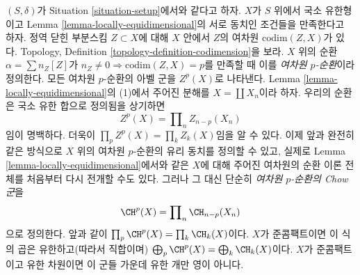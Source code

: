 \noindent
$(S, \delta)$가 Situation \ref{situation-setup}에서와 같다고 하자.
$X$가 $S$ 위에서 국소 유한형이고 Lemma
\ref{lemma-locally-equidimensional}의 서로 동치인 조건들을 만족한다고
하자. 정역 닫힌 부분스킴 $Z \subset X$에 대해 $X$ 안에서 $Z$의
여차원 $\text{codim}(Z, X)$가 있다. Topology, Definition
\ref{topology-definition-codimension}을 보라.
$X$ 위의 순환 $\alpha = \sum n_Z[Z]$가
$n_Z \not = 0 \Rightarrow \text{codim}(Z, X) = p$를 만족할 때 이를
{\it 여차원 $p$-순환}이라 정의한다. 모든 여차원 $p$-순환의 아벨 군을
$Z^p(X)$로 나타낸다. Lemma \ref{lemma-locally-equidimensional}의 (1)에서
주어진 분해를 $X = \coprod X_n$이라 하자. 우리의 순환은 국소 유한
합으로 정의됨을 상기하면
$$
Z^p(X) = \prod\nolimits_n Z_{n - p}(X_n)
$$
임이 명백하다. 더욱이 $\prod_p Z^p(X) = \prod_k Z_k(X)$임을 알 수
있다. 이제 앞과 완전히 같은 방식으로 $X$ 위의 여차원 $p$-순환의
유리 동치를 정의할 수 있고, 실제로 Lemma
\ref{lemma-locally-equidimensional}에서와 같은 $X$에 대해 주어진
여차원의 순환 이론 전체를 처음부터 다시 전개할 수도 있다. 그러나
그 대신 단순히 {\it 여차원 $p$-순환의 Chow 군}을
$$
\CH^p(X) = \prod\nolimits_n \CH_{n - p}(X_n)
$$
으로 정의한다. 앞과 같이 $\prod_p \CH^p(X) = \prod_k \CH_k(X)$이다.
$X$가 준콤팩트이면 이 식의 곱은 유한하고(따라서 직합이며)
$\bigoplus_p \CH^p(X) = \bigoplus_k \CH_k(X)$이다. $X$가 준콤팩트이고
유한 차원이면 이 군들 가운데 유한 개만 영이 아니다.

